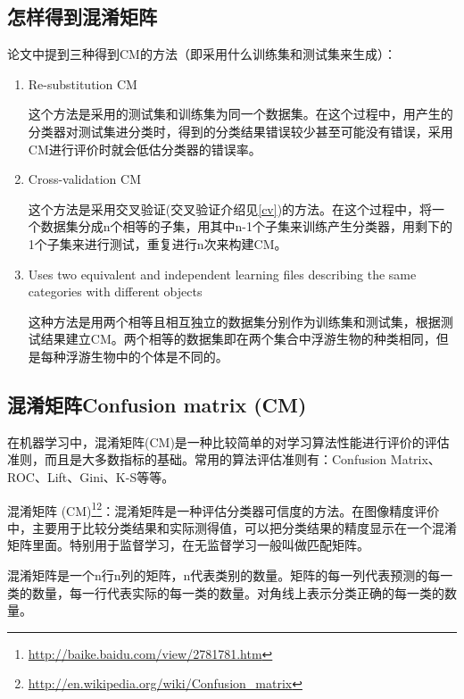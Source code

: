 \documentclass[12pt]{article}
\begin{document}
\subsection{怎样得到混淆矩阵}
论文中提到三种得到CM的方法（即采用什么训练集和测试集来生成）：
    \begin{enumerate}
        \item Re-substitution CM
        
       这个方法是采用的测试集和训练集为同一个数据集。在这个过程中，用产生的分类器对测试集进分类时，得到的分类结果错误较少甚至可能没有错误，采用CM进行评价时就会低估分类器的错误率。
        \item Cross-validation CM
        
        这个方法是采用交叉验证(交叉验证介绍见\ref{cv})的方法。在这个过程中，将一个数据集分成n个相等的子集，用其中n-1个子集来训练产生分类器，用剩下的1个子集来进行测试，重复进行n次来构建CM。
        \item Uses two equivalent and independent learning files describing the same categories with different objects
        
        这种方法是用两个相等且相互独立的数据集分别作为训练集和测试集，根据测试结果建立CM。两个相等的数据集即在两个集合中浮游生物的种类相同，但是每种浮游生物中的个体是不同的。
    \end{enumerate}
    



\subsection{混淆矩阵Confusion matrix (CM)}
\label{CM}

在机器学习中，混淆矩阵(CM)是一种比较简单的对学习算法性能进行评价的评估准则，而且是大多数指标的基础。常用的算法评估准则有：Confusion Matrix、ROC、Lift、Gini、K-S等等。\newline

混淆矩阵 (CM)\footnote{\url{http://baike.baidu.com/view/2781781.htm}}\footnote{\url{http://en.wikipedia.org/wiki/Confusion_matrix}}：混淆矩阵是一种评估分类器可信度的方法。在图像精度评价中，主要用于比较分类结果和实际测得值，可以把分类结果的精度显示在一个混淆矩阵里面。特别用于监督学习，在无监督学习一般叫做匹配矩阵。

混淆矩阵是一个n行n列的矩阵，n代表类别的数量。矩阵的每一列代表预测的每一类的数量，每一行代表实际的每一类的数量。对角线上表示分类正确的每一类的数量。
\end{document}

